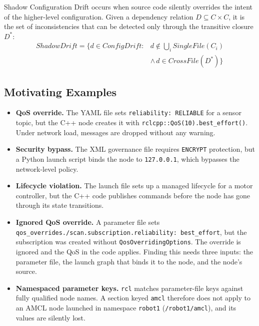\documentclass[conference]{IEEEtran}
\newcommand{\code}[1]{\texttt{#1}}
\begin{document}
Shadow Configuration Drift occurs when source code silently overrides the intent of the
higher-level configuration. Given a dependency relation $D \subseteq C \times C$, it is the set
of inconsistencies that can be detected only through the transitive closure $D^*$:
\begin{equation}
\begin{split}
\mathit{ShadowDrift} = \Big\{ d \in \mathit{ConfigDrift} :{}
  & d \notin {\textstyle\bigcup_i} \mathit{SingleFile}(C_i)\\
  & \wedge\, d \in \mathit{CrossFile}(D^*) \Big\}
\end{split}
\end{equation}

\subsection{Motivating Examples}

\begin{itemize}
\item \textbf{QoS override.} The YAML file sets \code{reliability: RELIABLE} for a sensor topic, but the
  C++ node creates it with \code{rclcpp::QoS(10).best\_effort()}. Under network load, messages
  are dropped without any warning.
\item \textbf{Security bypass.} The XML governance file requires \code{ENCRYPT} protection, but a Python
  launch script binds the node to \code{127.0.0.1}, which bypasses the network-level policy.
\item \textbf{Lifecycle violation.} The launch file sets up a managed lifecycle for a motor controller,
  but the C++ code publishes commands before the node has gone through its state transitions.
\item \textbf{Ignored QoS override.} A parameter file sets
  \code{qos\_overrides./scan.subscription.reliability: best\_effort}, but the subscription was
  created without \code{QosOverridingOptions}. The override is ignored and the QoS in the code
  applies. Finding this needs three inputs: the parameter file, the launch graph that binds it
  to the node, and the node's source.
\item \textbf{Namespaced parameter keys.} \code{rcl} matches parameter-file keys against fully
  qualified node names. A section keyed \code{amcl} therefore does not apply to an AMCL node
  launched in namespace \code{robot1} (\code{/robot1/amcl}), and its values are silently lost.
\end{itemize}
\end{document}
